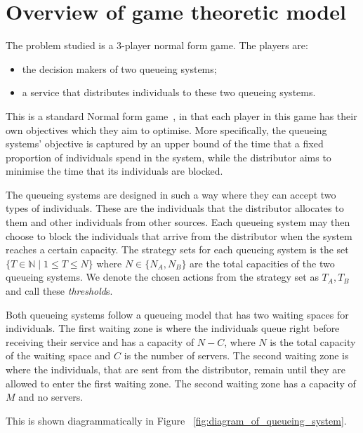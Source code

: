 \section{Overview of game theoretic model}

The problem studied is a 3-player normal form game. The players are:
  
\begin{itemize}
    \item the decision makers of two queueing systems;
    \item a service that distributes individuals to these two queueing systems.
\end{itemize}

This is a standard Normal form game~\cite{Maschler2013},  
in that each player in this game has their own objectives which they aim to 
optimise.
More specifically, the queueing systems' objective is captured by an upper bound
of the time that a fixed proportion of individuals spend in the system, 
while the distributor aims to minimise the time that its individuals 
are blocked.   

The queueing systems are designed in such a way where they can accept two types
of individuals. 
These are the individuals that the distributor allocates to them and 
other individuals from other sources. 
Each queueing system may then choose to block the individuals that arrive from 
the distributor when the system reaches a certain capacity. 
The strategy sets for each queueing system is the set 
\( \{T \in \mathbb{N} \;|\; 1 \leq T \leq N\} \) where \(N \in\{N_A, N_B\}\) are 
the total capacities of the two queueing systems. We denote the chosen actions 
from the strategy set as \(T_A, T_B\) and call these \textit{threshold}s.

Both queueing systems follow a queueing model that has two waiting spaces for 
individuals. 
The first waiting zone is where the individuals queue right before receiving 
their service and has a capacity of \( N - C \), where \(N\) is the total 
capacity of the waiting space and \(C\) is the number of servers. 
The second waiting zone is where the individuals, that are sent from the 
distributor, remain until they are allowed to enter the first waiting zone.
The second waiting zone has a capacity of \(M\) and no servers.

This is shown diagrammatically in Figure ~\ref{fig:diagram_of_queueing_system}.

